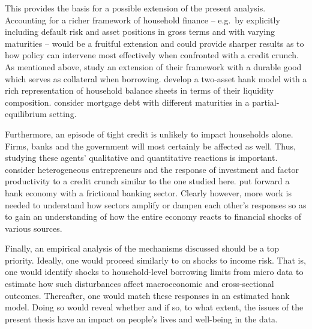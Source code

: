 \documentclass[a4paper,12pt]{article} %
\numberwithin{equation}{section} %
\numberwithin{figure}{section}
\numberwithin{table}{section}
\begin{document}
This provides the basis for a possible extension of the present analysis. Accounting for a richer framework of household finance -- e.g.~by explicitly including default risk and asset positions in gross terms and with varying maturities -- would be a fruitful extension and could provide sharper results as to how policy can intervene most effectively when confronted with a credit crunch. As mentioned above, \textcite{gl2017} study an extension of their framework with a durable good which serves as collateral when borrowing. \textcite{kaplan2018} develop a two-asset \Gls{hank} model with a rich representation of household balance sheets in terms of their liquidity composition. \textcite{guerrieri2020} consider mortgage debt with different maturities in a partial-equilibrium setting.

Furthermore, an episode of tight credit is unlikely to impact households alone. Firms, banks and the government will most certainly be affected as well. Thus, studying these agents' qualitative and quantitative reactions is important. \textcite{buera2020} consider heterogeneous entrepreneurs and the response of investment and factor productivity to a credit crunch similar to the one studied here. \textcite{lee2021} put forward a \Gls{hank} economy with a frictional banking sector. Clearly however, more work is needed to understand how sectors amplify or dampen each other's responses so as to gain an understanding of how the entire economy reacts to financial shocks of various sources.

Finally, an empirical analysis of the mechanisms discussed should be a top priority. Ideally, one would proceed similarly to \textcite{bayer2019} on shocks to income risk. That is, one would identify shocks to household-level borrowing limits from micro data to estimate how such disturbances affect macroeconomic and cross-sectional outcomes. Thereafter, one would match these responses in an estimated \Gls{hank} model. Doing so would reveal whether and if so, to what extent, the issues of the present thesis have an impact on people's lives and well-being in the data.

\newpage
\thispagestyle{plain}
\printbibliography[heading=bibintoc] %
\end{document}
